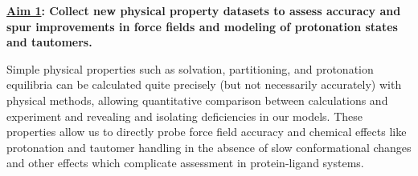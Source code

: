\documentclass[11pt]{article}
\begin{document}
{\bf \underline{Aim 1}: Collect new physical property datasets to assess accuracy and spur improvements in force fields and modeling of protonation states and tautomers.} 


Simple physical properties such as solvation, partitioning, and protonation equilibria can be calculated quite precisely (but not necessarily accurately) with physical methods, allowing quantitative comparison between calculations and experiment and revealing and isolating deficiencies in our models. 
These properties allow us to directly probe force field accuracy and chemical effects like protonation and tautomer handling in the absence of slow conformational changes and other effects which complicate assessment in protein-ligand systems. 
\end{document}
